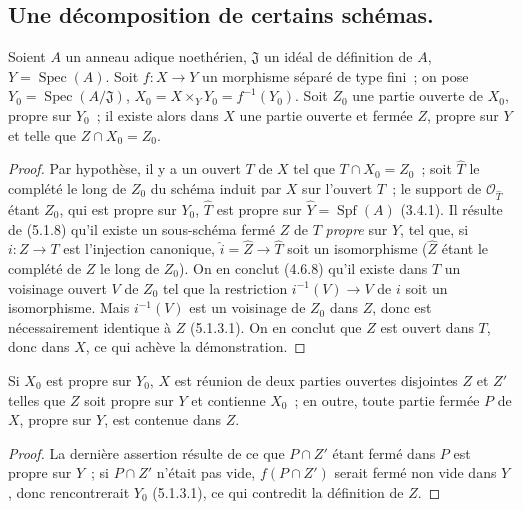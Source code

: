 \subsection{Une décomposition de certains schémas.}
\label{subsection:III.5.5-fr}

\begin{proposition}[5.5.1]
\label{III.5.5.1-fr}
Soient $A$ un anneau adique noethérien, $\mathfrak J$ un idéal de définition
de $A$, $Y=\operatorname{Spec}(A)$. Soit $f:X\to Y$ un morphisme séparé de
type fini~; on pose $Y_0=\operatorname{Spec}(A/\mathfrak J)$,
$X_0=X\times_Y Y_0=f^{-1}(Y_0)$. Soit $Z_0$ une partie ouverte de $X_0$,
propre sur $Y_0$~; il existe alors dans $X$ une partie ouverte et fermée $Z$,
propre sur $Y$ et telle que $Z\cap X_0=Z_0$.
\end{proposition}

\begin{proof}
Par hypothèse, il y a un ouvert $T$ de $X$ tel que $T\cap X_0=Z_0$~; soit
$\widehat T$ le complété le long de $Z_0$ du schéma induit par $X$ sur
l'ouvert $T$~; le support de $\mathcal O_{\widehat T}$ étant $Z_0$, qui est
propre sur $Y_0$, $\widehat T$ est propre sur
$\widehat Y=\operatorname{Spf}(A)$ (3.4.1). Il résulte de (5.1.8) qu'il existe
un sous-schéma fermé $Z$ de $T$ \emph{propre} sur $Y$, tel que, si $i:Z\to T$ est
l'injection canonique, $\widehat i=\widehat Z\to\widehat T$ soit un
isomorphisme ($\widehat Z$ étant le complété de $Z$ le long de $Z_0$). On en
conclut (4.6.8) qu'il existe dans $T$ un voisinage ouvert $V$ de $Z_0$ tel que
la restriction $i^{-1}(V)\to V$ de $i$ soit un isomorphisme. Mais
$i^{-1}(V)$ est un voisinage de $Z_0$ dans $Z$, donc est nécessairement
identique à $Z$ (5.1.3.1). On en conclut que $Z$ est ouvert dans $T$, donc
dans $X$, ce qui achève la démonstration.
\end{proof}

\begin{corollary}[5.5.2]
\label{III.5.5.2-fr}
Si $X_0$ est propre sur $Y_0$, $X$ est réunion de deux parties ouvertes
disjointes $Z$ et $Z'$ telles que $Z$ soit propre sur $Y$ et contienne $X_0$~;
en outre, toute partie fermée $P$ de $X$, propre sur $Y$, est contenue dans
$Z$.
\end{corollary}

\begin{proof}
La dernière assertion résulte de ce que $P\cap Z'$ étant fermé dans $P$ est
propre sur $Y$~; si $P\cap Z'$ n'était pas vide, $f(P\cap Z')$ serait fermé
non vide dans $Y$, donc rencontrerait $Y_0$ (5.1.3.1), ce qui contredit la
définition de $Z$.
\end{proof}

